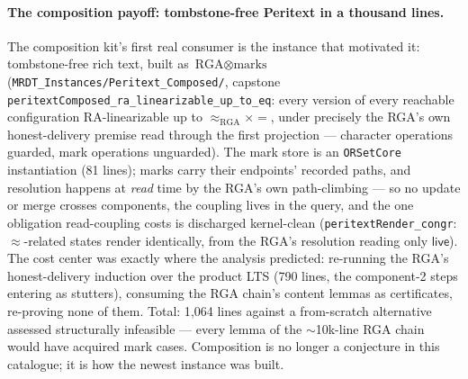 \documentclass[11pt]{article}
\newcommand{\lean}[1]{\texttt{#1}}
\newcommand{\contains}{\mathsf{live}}
\newcommand{\eqobs}{\approx}
\begin{document}
\paragraph{The composition payoff: tombstone-free Peritext in a thousand
lines.} The composition kit's first real consumer is the instance that
motivated it: tombstone-free rich text, built as
$\text{RGA} \otimes \text{marks}$
(\lean{MRDT\_Instances/Peritext\_Composed/}, capstone
\lean{peritextComposed\_ra\_linearizable\_up\_to\_eq}: every version of every
reachable configuration RA-linearizable up to $\eqobs_{\text{RGA}} \times
{=}$, under precisely the RGA's own honest-delivery premise read through
the first projection --- character operations guarded, mark operations
unguarded). The mark store is an \lean{ORSetCore} instantiation (81
lines); marks carry their endpoints' recorded paths, and resolution
happens at \emph{read} time by the RGA's own path-climbing --- so no
update or merge crosses components, the coupling lives in the query, and
the one obligation read-coupling costs is discharged kernel-clean
(\lean{peritextRender\_congr}: $\eqobs$-related states render
identically, from the RGA's resolution reading only $\contains$). The
cost center was exactly where the analysis predicted: re-running the
RGA's honest-delivery induction over the product LTS (790 lines, the
component-2 steps entering as stutters), consuming the RGA chain's
content lemmas as certificates, re-proving none of them. Total:
1{,}064 lines against a from-scratch alternative assessed structurally
infeasible --- every lemma of the ${\sim}$10k-line RGA chain would have
acquired mark cases. Composition is no longer a conjecture in this
catalogue; it is how the newest instance was built.
\end{document}
